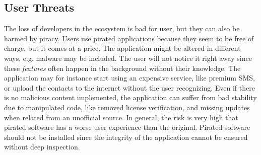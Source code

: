 \subsection{User Threats} \label{subsection:foundation-piracy-users}
The loss of developers in the ecosystem is bad for user, but they can also be harmed by piracy.
Users use pirated applications because they seem to be free of charge, but it comes at a price.
The application might be altered in different ways, e.g. malware may be included.
The user will not notice it right away since these \textit{features} often happen in the background without their knowledge.
The application may for instance start using an expensive service, like premium SMS, or upload the contacts to the internet without the user recognizing.
Even if there is no malicious content implemented, the application can suffer from bad stability due to manipulated code, like removed license verification, and missing updates when related from an unofficial source.
In general, the risk is very high that pirated software has a worse user experience than the original. \cite{bitdefenderPlagiarism} \cite{lierschDeveloperThreats}
\newline
Pirated software should not be installed since the integrity of the application cannot be ensured without deep inspection.
